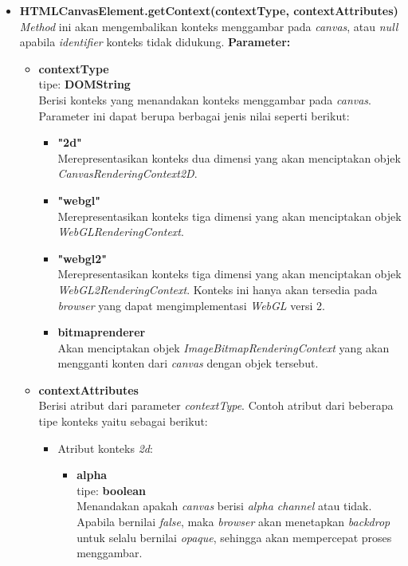 \begin{itemize}
	\item \textbf{HTMLCanvasElement.getContext(contextType, contextAttributes)} \\
	\textit{Method} ini akan mengembalikan konteks menggambar pada \textit{canvas}, atau \textit{null} apabila \textit{identifier} konteks tidak didukung.
	\textbf{Parameter:} 
	\begin{itemize}
		\item \textbf{contextType} \\tipe: \textbf{DOMString} \\ Berisi konteks yang menandakan konteks menggambar pada \textit{canvas}. Parameter ini dapat berupa berbagai jenis nilai seperti berikut:
		\begin{itemize}
			\item \textbf{"2d"} \\ Merepresentasikan konteks dua dimensi yang akan menciptakan objek \textit{CanvasRenderingContext2D}.
			\item \textbf{"webgl"} \\ Merepresentasikan konteks tiga dimensi yang akan menciptakan objek \textit{WebGLRenderingContext}.
			\item \textbf{"webgl2"} \\ Merepresentasikan konteks tiga dimensi yang akan menciptakan objek \textit{WebGL2RenderingContext}. Konteks ini hanya akan tersedia pada \textit{browser} yang dapat mengimplementasi \textit{WebGL} versi 2.
			\item \textbf{bitmaprenderer} \\ Akan menciptakan objek \textit{ImageBitmapRenderingContext} yang akan mengganti konten dari \textit{canvas} dengan objek tersebut.
		\end{itemize}
	
		\item \textbf{contextAttributes} \\ Berisi atribut dari parameter \textit{contextType}. Contoh atribut dari beberapa tipe konteks yaitu sebagai berikut:
		\begin{itemize}
			\item Atribut konteks \textit{2d}:
			\begin{itemize}
				\item \textbf{alpha} \\tipe: \textbf{boolean} \\ Menandakan apakah \textit{canvas} berisi \textit{alpha channel} atau tidak. Apabila bernilai \textit{false}, maka \textit{browser} akan menetapkan \textit{backdrop} untuk selalu bernilai \textit{opaque}, sehingga akan mempercepat proses menggambar.
			\end{itemize}
			

\end{itemize}
\end{itemize}
\end{itemize}
